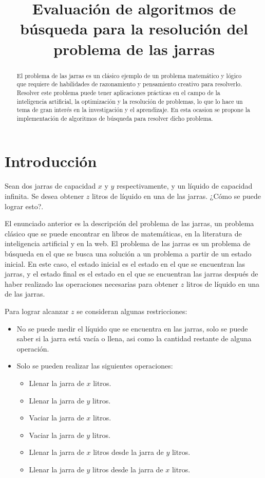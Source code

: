 \documentclass[journal]{IEEEtran}
\begin{document}
\title{Evaluación de algoritmos de búsqueda para la resolución del problema de las jarras}

\author{}

\maketitle

\begin{abstract}
  El problema de las jarras es un clásico ejemplo de un problema matemático y lógico que requiere de habilidades de razonamiento y pensamiento creativo para resolverlo. Resolver este problema puede tener aplicaciones prácticas en el campo de la inteligencia artificial, la optimización y la resolución de problemas, lo que lo hace un tema de gran interés en la investigación y el aprendizaje. En esta ocasion se propone la implementación de algoritmos de búsqueda para resolver dicho problema.
\end{abstract}

\section{Introducción}
Sean dos jarras de capacidad $x$ y $y$ respectivamente, y un líquido de capacidad infinita. Se desea obtener $z$ litros de líquido en una de las jarras. ¿Cómo se puede lograr esto?. 

El enunciado anterior es la descripción del problema de las jarras, un problema clásico que se puede encontrar en libros de matemáticas, en la literatura de inteligencia artificial y en la web. El problema de las jarras es un problema de búsqueda en el que se busca una solución a un problema a partir de un estado inicial. En este caso, el estado inicial es el estado en el que se encuentran las jarras, y el estado final es el estado en el que se encuentran las jarras después de haber realizado las operaciones necesarias para obtener $z$ litros de líquido en una de las jarras.

Para lograr alcanzar $z$ se consideran algunas restricciones:
\begin{itemize}
  \item No se puede medir el líquido que se encuentra en las jarras, solo se puede saber si la jarra está vacía o llena, asi como la cantidad restante de alguna operación.
  \item Solo se pueden realizar las siguientes operaciones:
  \begin{itemize}
    \item Llenar la jarra de $x$ litros.
    \item Llenar la jarra de $y$ litros.
    \item Vaciar la jarra de $x$ litros.
    \item Vaciar la jarra de $y$ litros.
    \item Llenar la jarra de $x$ litros desde la jarra de $y$ litros.
    \item Llenar la jarra de $y$ litros desde la jarra de $x$ litros.
  \end{itemize}
\end{itemize}
\end{document}
